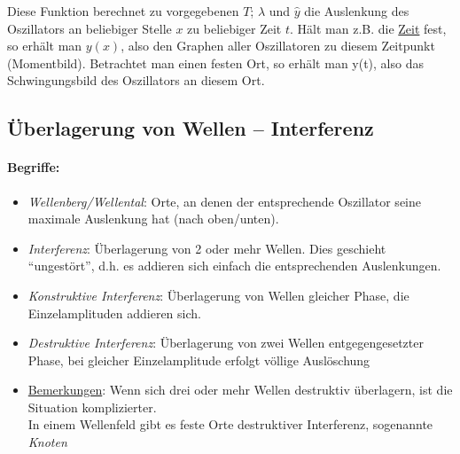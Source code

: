 \documentclass[a4paper]{scrartcl}
\begin{document}
Diese Funktion berechnet zu vorgegebenen \(T\); \(\lambda\) und \(\hat{y}\) die
Auslenkung des Oszillators an beliebiger Stelle \(x\) zu beliebiger Zeit \(t\).
Hält man z.B. die \underline{Zeit} fest, so erhält man \(y(x)\), also den
Graphen aller Oszillatoren zu diesem Zeitpunkt (Momentbild). Betrachtet man
einen festen Ort, so erhält man y(t), also das Schwingungsbild des Oszillators
an diesem Ort.

\subsection{Überlagerung von Wellen -- Interferenz}
\paragraph{Begriffe:} \begin{itemize}
	\item \emph{Wellenberg/Wellental}: Orte, an denen der entsprechende
		Oszillator seine maximale Auslenkung hat (nach oben/unten).
	\item \emph{Interferenz}: Überlagerung von 2 oder mehr Wellen. Dies
		geschieht "`ungestört"', d.h. es addieren sich einfach die
		entsprechenden Auslenkungen.
	\item \emph{Konstruktive Interferenz}: Überlagerung von Wellen gleicher
		Phase, die Einzelamplituden addieren sich.
	\item \emph{Destruktive Interferenz}: Überlagerung von zwei Wellen
		entgegengesetzter Phase, bei gleicher Einzelamplitude erfolgt völlige
		Auslöschung
	\item \underline{Bemerkungen}: Wenn sich drei oder mehr Wellen destruktiv
		überlagern, ist die Situation komplizierter.\\
		In einem Wellenfeld gibt es feste Orte destruktiver Interferenz,
		sogenannte \emph{Knoten}
\end{itemize}
\end{document}
